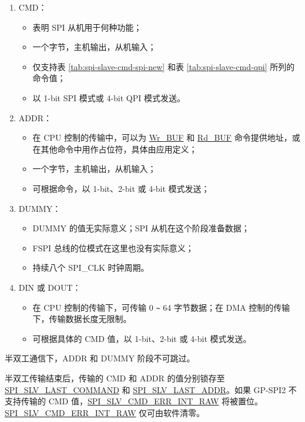 \documentclass[main\_\_CN.tex]{subfiles}
\begin{document}
\begin{enumerate} 
   \item CMD： 
        \begin{itemize}
            \item 表明 SPI 从机用于何种功能； 
            \item 一个字节，主机输出，从机输入； 
            \item 仅支持表 \ref{tab:spi-slave-cmd-spi-new} 和表 \ref{tab:spi-slave-cmd-qpi} 所列的命令值；
            \item 以 1-bit SPI 模式或 4-bit QPI 模式发送。
        \end{itemize}
    
   \item ADDR： 
        \begin{itemize}
            \item 在 CPU 控制的传输中，可以为 \hyperlink{cmd:wrbuf}{Wr\_BUF} 和 \hyperlink{cmd:rdbuf}{Rd\_BUF} 命令提供地址，或在其他命令中用作占位符，具体由应用定义；
            \item 一个字节，主机输出，从机输入；
            \item 可根据命令，以 1-bit、2-bit 或 4-bit 模式发送；
        \end{itemize}
      
   \item DUMMY： 
        \begin{itemize}
            \item DUMMY 的值无实际意义；SPI 从机在这个阶段准备数据；
            \item FSPI 总线的位模式在这里也没有实际意义；
            \item 持续八个 SPI\_CLK 时钟周期。
        \end{itemize}
   
   \item DIN 或 DOUT： 

        \begin{itemize}
            \item 在 CPU 控制的传输下，可传输 0 \verb+~+ 64 字节数据；在 DMA 控制的传输下，传输数据长度无限制。
            \item 可根据具体的 CMD 值，以 1-bit、2-bit 或 4-bit 模式发送。
        \end{itemize}
    
   \end{enumerate}

\begin{tiplisting}
半双工通信下，ADDR 和 DUMMY 阶段不可跳过。
\end{tiplisting}
\vspace{-1em}
半双工传输结束后，传输的 CMD 和 ADDR 的值分别锁存至 \hyperref[fielddesc:SPISLVLASTCOMMAND]{SPI\_SLV\_LAST\_COMMAND} 和 \hyperref[fielddesc:SPISLVLASTADDR]{SPI\_SLV\_LAST\_ADDR}。如果 GP-SPI2 不支持传输的 CMD 值，\hyperref[fielddesc:SPISLVCMDERRINTRAW]{SPI\_SLV\_CMD\_ERR\_INT\_RAW} 将被置位。 \hyperref[fielddesc:SPISLVCMDERRINTRAW]{SPI\_SLV\_CMD\_ERR\_INT\_RAW} 仅可由软件清零。
\end{document}
